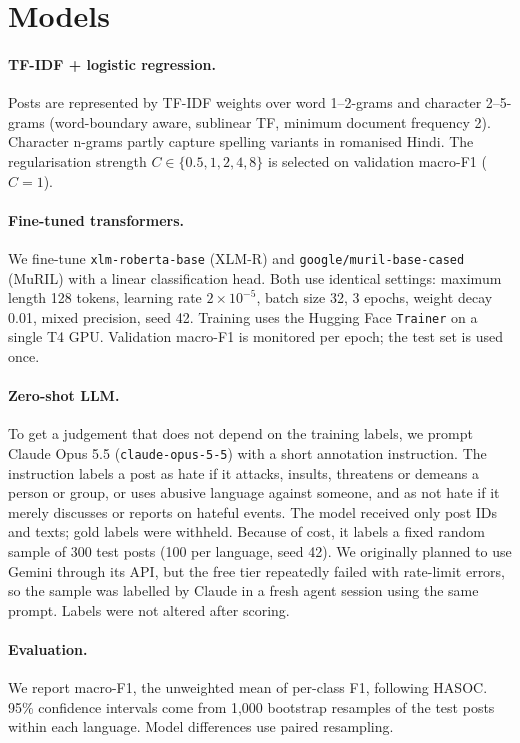 \documentclass[11pt,a4paper]{article}
\begin{document}
\section{Models}

\paragraph{TF-IDF + logistic regression.}
Posts are represented by TF-IDF weights over word 1--2-grams and character 2--5-grams (word-boundary aware, sublinear TF, minimum document frequency 2).
Character n-grams partly capture spelling variants in romanised Hindi.
The regularisation strength $C \in \{0.5,1,2,4,8\}$ is selected on validation macro-F1 ($C=1$).

\paragraph{Fine-tuned transformers.}
We fine-tune \texttt{xlm-roberta-base} (XLM-R) and \texttt{google/muril-base-cased} (MuRIL) with a linear classification head.
Both use identical settings: maximum length 128 tokens, learning rate $2\times10^{-5}$, batch size 32, 3 epochs, weight decay 0.01, mixed precision, seed 42.
Training uses the Hugging Face \texttt{Trainer} \citep{wolf2020transformers} on a single T4 GPU.
Validation macro-F1 is monitored per epoch; the test set is used once.

\paragraph{Zero-shot LLM.}
To get a judgement that does not depend on the training labels, we prompt Claude Opus 5.5 (\texttt{claude-opus-5-5}) with a short annotation instruction.
The instruction labels a post as hate if it attacks, insults, threatens or demeans a person or group, or uses abusive language against someone, and as not hate if it merely discusses or reports on hateful events.
The model received only post IDs and texts; gold labels were withheld.
Because of cost, it labels a fixed random sample of 300 test posts (100 per language, seed 42).
We originally planned to use Gemini through its API, but the free tier repeatedly failed with rate-limit errors, so the sample was labelled by Claude in a fresh agent session using the same prompt.
Labels were not altered after scoring.

\paragraph{Evaluation.}
We report macro-F1, the unweighted mean of per-class F1, following HASOC.
95\% confidence intervals come from 1,000 bootstrap resamples of the test posts within each language. Model differences use paired resampling.
\end{document}
